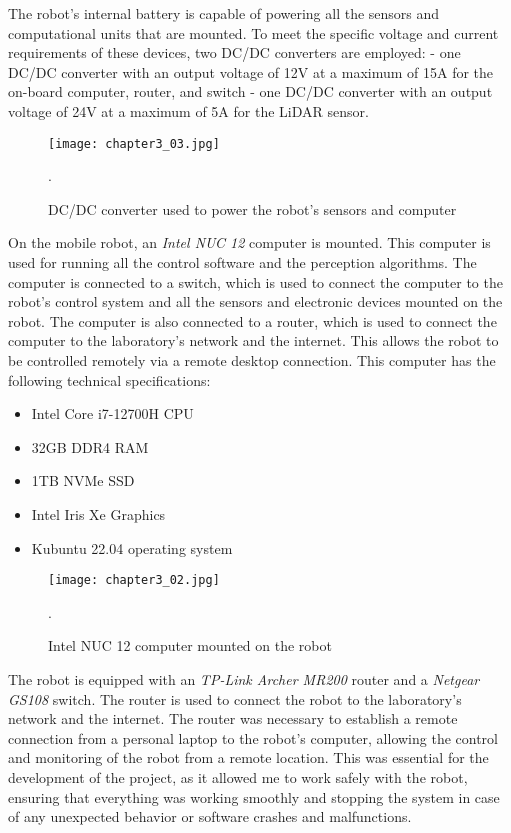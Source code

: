 The robot's internal battery is capable of powering all the sensors and computational
units that are mounted. To meet the specific voltage and current requirements of these devices, 
two DC/DC converters are employed:
- one DC/DC converter with an output voltage of 12V at a maximum of 15A for the on-board computer, router, and switch
- one DC/DC converter with an output voltage of 24V at a maximum of 5A for the LiDAR sensor.

\begin{figure}[ht]
    \centering
    \texttt{[image: chapter3\_03.jpg]}
    \captionsetup{width=1\linewidth}
    \caption{DC/DC converter used to power the robot's sensors and computer}.
    \label{fig:c3_img03}
\end{figure}

On the mobile robot, an \textit{Intel NUC 12} computer is mounted. This computer is used for running all the control
software and the perception algorithms. The computer is connected to a switch, which is used to connect
the computer to the robot's control system and all the sensors and electronic devices mounted on the robot.
The computer is also connected to a router, which is used to connect the computer to the laboratory's network
and the internet. This allows the robot to be controlled remotely via a remote desktop connection.
This computer has the following technical specifications:

\begin{itemize}
    \item Intel Core i7-12700H CPU
    \item 32GB DDR4 RAM
    \item 1TB NVMe SSD
    \item Intel Iris Xe Graphics
    \item Kubuntu 22.04 operating system
\end{itemize}

\begin{figure}[ht]
    \centering
    \texttt{[image: chapter3\_02.jpg]}
    \captionsetup{width=1\linewidth}
    \caption{Intel NUC 12 computer mounted on the robot}.
    \label{fig:c3_img02}
\end{figure}

The robot is equipped with an \textit{TP-Link Archer MR200} router and a \textit{Netgear GS108} switch.
The router is used to connect the robot to the laboratory's network and the internet. The router was necessary to
establish a remote connection from a personal laptop to the robot's computer, allowing the control and monitoring
of the robot from a remote location. This was essential for the development of the project, as it allowed me to
work safely with the robot, ensuring that everything was working smoothly and stopping the system in case of any
unexpected behavior or software crashes and malfunctions.

